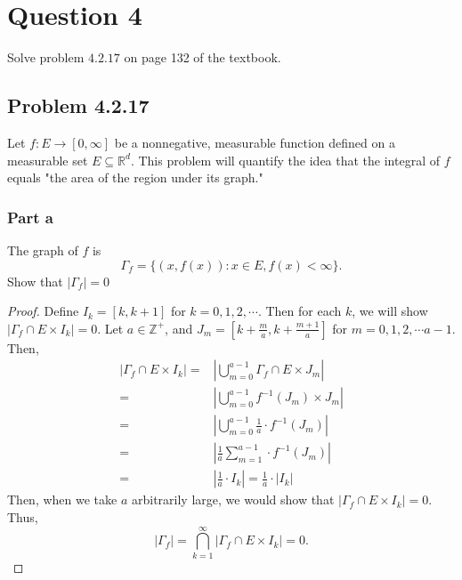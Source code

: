 \section{Question 4}

\begin{question}
    Solve problem $4.2 .17$ on page 132 of the textbook.
\end{question}

\subsection{Problem 4.2.17}

\begin{question}
    Let $f: E \rightarrow[0, \infty]$ be a nonnegative, measurable function defined on a measurable set $E \subseteq \mathbb{R}^d$. This problem will quantify the idea that the integral of $f$ equals "the area of the region under its graph."
\end{question}

\subsubsection{Part a}

\begin{question}
    The graph of $f$ is
    $$
    \Gamma_f=\{(x, f(x)): x \in E, f(x)<\infty\} .
    $$
    Show that $\left|\Gamma_f\right|=0$
\end{question}

\begin{answer}
    \begin{proof}
        Define $I_k = [k,k+1]$ for $k = 0,1,2,\cdots$. Then for each $k$, we will show $\lvert \Gamma_f \cap E \times I_k \rvert = 0$. Let $a \in \mathbb{Z}^+$, and $J_m = \left[k+\tfrac{m}{a},k+\tfrac{m+1}{a}\right]$ for $m = 0,1,2,\cdots a-1$. Then,
        \begin{equation}
            \begin{aligned}
                \lvert \Gamma_f \cap E \times I_k \rvert =& \left \lvert \bigcup_{m=0}^{a-1} \Gamma_f \cap E \times J_m\right \rvert\\
                =& \left \lvert \bigcup_{m=0}^{a-1} f^{-1}(J_m) \times J_m\right \rvert\\
                =& \left \lvert \bigcup_{m=0}^{a-1} \tfrac{1}{a} \cdot f^{-1}(J_m)\right \rvert\\
                =& \left \lvert \tfrac{1}{a} \sum_{m = 1}^{a-1} \cdot f^{-1}(J_m)\right \rvert\\
                =& \left \lvert \tfrac{1}{a} \cdot I_k \right\rvert =  \tfrac{1}{a} \cdot \lvert I_k \rvert 
            \end{aligned}
        \end{equation}
        Then, when we take $a$ arbitrarily large, we would show that $\lvert \Gamma_f \cap E \times I_k \rvert = 0$. Thus,
        \begin{equation}
            \lvert \Gamma_f \rvert = \bigcap_{k=1}^{\infty}\lvert \Gamma_f \cap E \times I_k \rvert = 0.
        \end{equation}
    \end{proof}
\end{answer}

